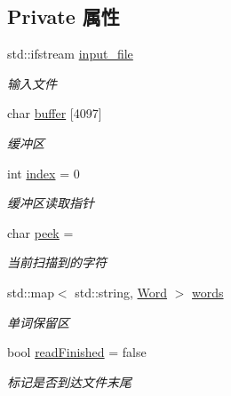 \subsection*{Private 属性}
\begin{DoxyCompactItemize}
\item 
\mbox{\label{class_lexer_a606dd5cec5ec316ca1b1df40823fb853}} 
std\+::ifstream \hyperlink{class_lexer_a606dd5cec5ec316ca1b1df40823fb853}{input\+\_\+file}
\begin{DoxyCompactList}\small\item\em 输入文件 \end{DoxyCompactList}\item 
\mbox{\label{class_lexer_a372c56c466c70d808bdcdb11e94bd914}} 
char \hyperlink{class_lexer_a372c56c466c70d808bdcdb11e94bd914}{buffer} \mbox{[}4097\mbox{]}
\begin{DoxyCompactList}\small\item\em 缓冲区 \end{DoxyCompactList}\item 
\mbox{\label{class_lexer_a266317e9b89ad0e681fdb21032ef00f8}} 
int \hyperlink{class_lexer_a266317e9b89ad0e681fdb21032ef00f8}{index} = 0
\begin{DoxyCompactList}\small\item\em 缓冲区读取指针 \end{DoxyCompactList}\item 
\mbox{\label{class_lexer_a1c13ae056a34e7ec483c561152bb8d49}} 
char \hyperlink{class_lexer_a1c13ae056a34e7ec483c561152bb8d49}{peek} = \textquotesingle{} \textquotesingle{}
\begin{DoxyCompactList}\small\item\em 当前扫描到的字符 \end{DoxyCompactList}\item 
\mbox{\label{class_lexer_add52df03b8546bfe059f4e1832141c16}} 
std\+::map$<$ std\+::string, \hyperlink{class_word}{Word} $>$ \hyperlink{class_lexer_add52df03b8546bfe059f4e1832141c16}{words}
\begin{DoxyCompactList}\small\item\em 单词保留区 \end{DoxyCompactList}\item 
\mbox{\label{class_lexer_a123d0134daef2ce492f0707342456afc}} 
bool \hyperlink{class_lexer_a123d0134daef2ce492f0707342456afc}{read\+Finished} = false
\begin{DoxyCompactList}\small\item\em 标记是否到达文件末尾 \end{DoxyCompactList}\end{DoxyCompactItemize}
